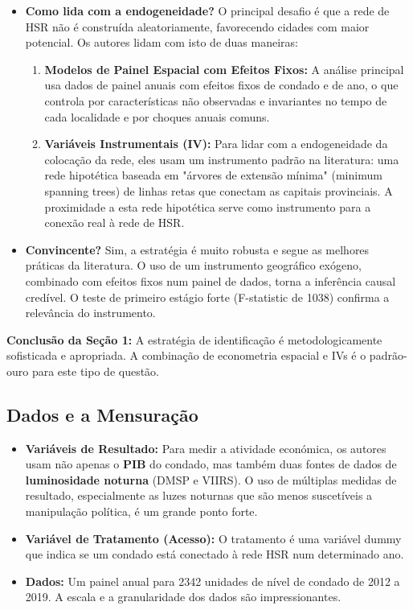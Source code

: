\documentclass[12pt, a4paper]{article}
\begin{document}
\begin{itemize}
    \item \textbf{Como lida com a endogeneidade?} O principal desafio é que a rede de HSR não é construída aleatoriamente, favorecendo cidades com maior potencial. Os autores lidam com isto de duas maneiras:
        \begin{enumerate}
            \item \textbf{Modelos de Painel Espacial com Efeitos Fixos:} A análise principal usa dados de painel anuais com efeitos fixos de condado e de ano, o que controla por características não observadas e invariantes no tempo de cada localidade e por choques anuais comuns.
            \item \textbf{Variáveis Instrumentais (IV):} Para lidar com a endogeneidade da colocação da rede, eles usam um instrumento padrão na literatura: uma rede hipotética baseada em "árvores de extensão mínima" (minimum spanning trees) de linhas retas que conectam as capitais provinciais. A proximidade a esta rede hipotética serve como instrumento para a conexão real à rede de HSR.
        \end{enumerate}
    \item \textbf{Convincente?} Sim, a estratégia é muito robusta e segue as melhores práticas da literatura. O uso de um instrumento geográfico exógeno, combinado com efeitos fixos num painel de dados, torna a inferência causal credível. O teste de primeiro estágio forte (F-statistic de 1038) confirma a relevância do instrumento.
\end{itemize}

\noindent\textbf{Conclusão da Seção 1:} A estratégia de identificação é metodologicamente sofisticada e apropriada. A combinação de econometria espacial e IVs é o padrão-ouro para este tipo de questão.

\subsection{Dados e a Mensuração}

\begin{itemize}
    \item \textbf{Variáveis de Resultado:} Para medir a atividade económica, os autores usam não apenas o \textbf{PIB} do condado, mas também duas fontes de dados de \textbf{luminosidade noturna} (DMSP e VIIRS). O uso de múltiplas medidas de resultado, especialmente as luzes noturnas que são menos suscetíveis a manipulação política, é um grande ponto forte.
    \item \textbf{Variável de Tratamento (Acesso):} O tratamento é uma variável dummy que indica se um condado está conectado à rede HSR num determinado ano.
    \item \textbf{Dados:} Um painel anual para 2342 unidades de nível de condado de 2012 a 2019. A escala e a granularidade dos dados são impressionantes.
\end{itemize}
\end{document}
